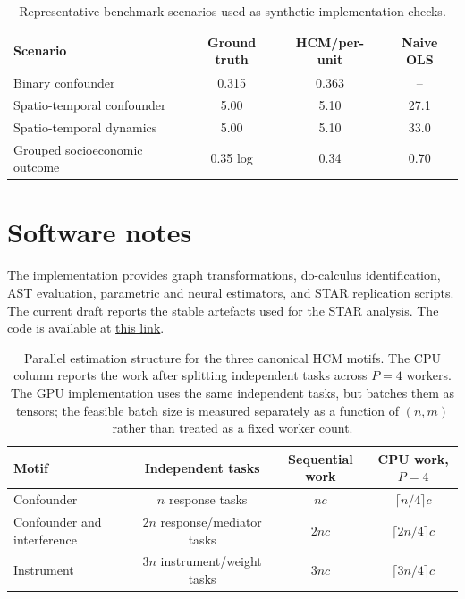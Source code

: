 \documentclass[unnumsec,webpdf,contemporary,large]{oup-authoring-template}%
\theoremstyle{thmstyleone}%
\theoremstyle{thmstyletwo}%
\theoremstyle{thmstylethree}%
\begin{document}
\begin{appendices}
\begin{table}[!htbp]
\centering
\caption{Representative benchmark scenarios used as synthetic implementation checks.}
\label{tab:benchmarks}
\begin{tabular}{lccc}
\toprule
Scenario & Ground truth & HCM/per-unit & Naive OLS \\
\midrule
Binary confounder & 0.315 & 0.363 & -- \\
Spatio-temporal confounder & 5.00 & 5.10 & 27.1 \\
Spatio-temporal dynamics & 5.00 & 5.10 & 33.0 \\
Grouped socioeconomic outcome & 0.35 log & 0.34 & 0.70 \\
\bottomrule
\end{tabular}
\end{table}

\section{Software notes}
\label{app:software-notes}
The implementation provides graph transformations, do-calculus identification, AST evaluation, parametric and neural estimators, and STAR replication scripts. The current draft reports the stable artefacts used for the STAR analysis. The code is available at \href{https://github.com/AI-vidence/hierarchicalcausalmodels}{this link}.

\begin{table}[!htbp]
\centering
\small
\caption{Parallel estimation structure for the three canonical HCM motifs. The CPU column reports the work after splitting independent tasks across $P=4$ workers. The GPU implementation uses the same independent tasks, but batches them as tensors; the feasible batch size is measured separately as a function of $(n,m)$ rather than treated as a fixed worker count.}
\label{tab:motifs}
\begin{tabular}{lccc}
\toprule
Motif & Independent tasks & Sequential work & CPU work, $P=4$ \\
\midrule
Confounder & $n$ response tasks & $nc$ & $\lceil n/4\rceil c$ \\
Confounder and interference & $2n$ response/mediator tasks & $2nc$ & $\lceil 2n/4\rceil c$ \\
Instrument & $3n$ instrument/weight tasks & $3nc$ & $\lceil 3n/4\rceil c$ \\
\bottomrule
\end{tabular}
\end{table}


\end{appendices}
\end{document}
